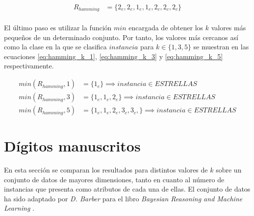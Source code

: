 \documentclass{article}
\begin{document}
			\begin{align}
			\label{eq:hamming_distance_results}
				R_{hamming} &= \{2_e, 2_e, 1_e, 1_e, 2_c, 2_c, 2_c\}
			\end{align}

			\paragraph{}
			El último paso es utilizar la función $min$ encargada de obtener los $k$ valores más pequeños de un determinado conjunto. Por tanto, los valores más cercanos así como la clase en la que se clasifica $instancia$ para $k \in \{1,3,5\}$ se muestran en las ecuaciones \eqref{eq:hamming_k_1}, \eqref{eq:hamming_k_3} y \eqref{eq:hamming_k_5} respectivamente.

			\begin{align}
			\label{eq:hamming_k_1}
				min(R_{hamming},1) &= \{ 1_e \}  \implies instancia \in ESTRELLAS \\
			\label{eq:hamming_k_3}
				min(R_{hamming},3) &= \{ 1_e, 1_e, 2_e\}  \implies instancia \in ESTRELLAS \\
			\label{eq:hamming_k_5}
				min(R_{hamming},5) &= \{ 1_e, 1_e, 2_e, 3_c, 3_c, \}  \implies instancia \in ESTRELLAS
			\end{align}

	\section{Dígitos manuscritos}

		\paragraph{}
		En esta sección se comparan los resultados para distintos valores de $k$ sobre un conjunto de datos de mayores dimensiones, tanto en cuanto al número de instancias que presenta como atributos de cada una de ellas. El conjunto de datos ha sido adaptado por \emph{D. Barber} para el libro \emph{Bayesian Reasoning and Machine Learning} \cite{barberBRML2012}.
\end{document}
